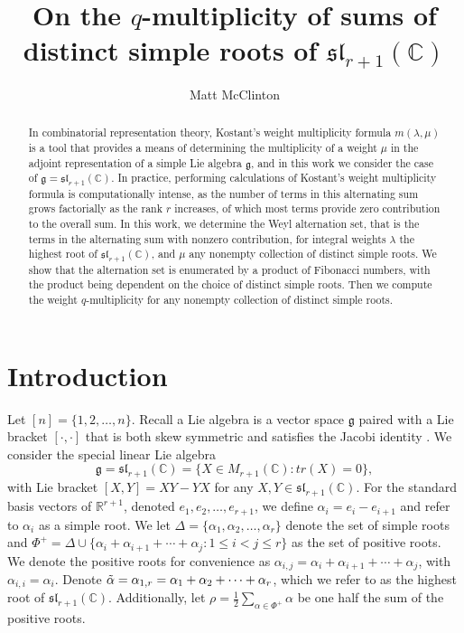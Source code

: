 \documentclass[10pt]{article}
\newcommand{\C}[0]{\mathbb{C}}
\newcommand{\R}[0]{\mathbb{R}}
\newcommand{\speclin}[0]{\mathfrak{sl}_{r+1}(\mathbb{C})}
\newcommand{\hr}[0]{\Tilde{\alpha}}
\begin{document}
\title{
On the $q$-multiplicity of sums of distinct simple roots of $\mathfrak{sl}_{r+1}(\mathbb{C})$
}
\author{Matt McClinton}
\maketitle
\begin{abstract}
    In combinatorial representation theory, Kostant's weight multiplicity formula $m(\lambda,\mu)$ is a tool that provides a means of determining the multiplicity of a weight $\mu$ in the adjoint representation of a simple Lie algebra $\mathfrak{g}$, and in this work we consider the case of $\mathfrak{g}=\mathfrak{sl}_{r+1}(\mathbb{C})$. 
    In practice, performing calculations of Kostant's weight multiplicity formula is computationally intense, as the number of terms in this alternating sum grows factorially as the rank $r$ increases, of which most terms provide zero contribution to the overall sum. 
    In this work, we determine the Weyl alternation set, that is the terms in the alternating sum with nonzero contribution, for integral weights $\lambda$ the highest root of $\mathfrak{sl}_{r+1}(\mathbb{C})$, and $\mu$ any nonempty collection of distinct simple roots. We show that the alternation set is enumerated by a product of Fibonacci numbers, with the product being dependent on the choice of distinct simple roots. Then we compute the weight $q$-multiplicity for any nonempty collection of distinct simple roots.
\end{abstract}
\section{Introduction}
Let $[n]=\{1,2,\ldots,n\}$. Recall a Lie algebra is a vector space $\mathfrak{g}$ paired with a Lie bracket $[\cdot,\cdot]$ that is both skew symmetric and satisfies the Jacobi identity \cite{Goodman_Wallach_2009}. We consider the special linear Lie algebra 
\[\mathfrak{g}=\speclin=\{X\in M_{r+1}(\C):tr(X)=0\},\]
with Lie bracket $[X,Y]=XY-YX$ for any $X,Y\in \speclin$. 
For the standard basis vectors of $\R^{r+1}$, denoted  $e_1,e_2,\ldots,e_{r+1}$, we define $\alpha_i=e_i-e_{i+1}$ and refer to $\alpha_i$ as a simple root. We let $\Delta=\{\alpha_1,\alpha_2,\ldots,\alpha_r\}$ denote the set of simple roots and $\Phi^+=\Delta\cup \{\alpha_i+\alpha_{i+1}+\cdots+\alpha_j:1\leq i < j \leq r\}$ as the set of positive roots. We denote the positive roots for convenience as $\alpha_{i,j}=\alpha_i+\alpha_{i+1}+\cdots +\alpha_{j}$, with $\alpha_{i,i}=\alpha_i$. Denote $\hr=\alpha_{1,r}=\alpha_1+\alpha_2+\cdots +\alpha_r$, which we refer to as the highest root of $\speclin$. Additionally, let $\rho=\frac{1}{2}\sum_{\alpha\in \Phi^+}\alpha$ be one half the sum of the positive roots.
\end{document}
